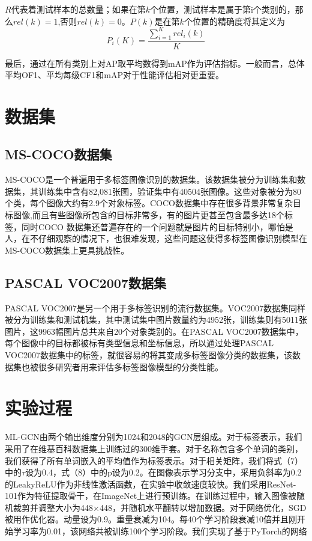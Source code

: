 $R$代表着测试样本的总数量；如果在第$k$个位置，测试样本是属于第i个类别的，那么$rel(k)=1$,否则$rel(k)=0$。$P(k)$是在第$k$个位置的精确度将其定义为
\begin{equation}
\label{dscNoStgProof0}
P_i(K) = \frac{\sum_{i=1}^{K}rel_i(k)}{K}
\end{equation}

最后，通过在所有类别上对AP取平均数得到mAP作为评估指标。一般而言，总体平均OF1、平均每级CF1和mAP对于性能评估相对更重要。

\section{数据集}

\subsection{MS-COCO数据集}
MS-COCO\cite{Jiang2016CNN}是一个普遍用于多标签图像识别的数据集。该数据集被分为训练集和数据集，其训练集中含有82,081张图，验证集中有40504张图像。这些对象被分为80个类，每个图像大约有2.9个对象标签。COCO数据集中存在很多背景非常复杂目标图像,而且有些图像所包含的目标非常多，有的图片更甚至包含最多达18个标签，同时COCO 数据集还普遍存在的一个问题就是图片的目标特别小，哪怕是人，在不仔细观察的情况下，也很难发现，这些问题这使得多标签图像识别模型在MS-COCO数据集上更具挑战性。

\subsection{PASCAL VOC2007数据集}
PASCAL VOC2007是另一个用于多标签识别的流行数据集。VOC2007数据集同样被分为训练集和测试机集，其中测试集中图片数量约为4952张，训练集则有5011张图片，这9963幅图片总共来自20个对象类别的。在PASCAL VOC2007数据集中，每个图像中的目标都被标有类型信息和坐标信息，所以通过处理PASCAL VOC2007数据集中的标签，就很容易的将其变成多标签图像分类的数据集，该数据集也被很多研究者用来评估多标签图像模型的分类性能。

\section{实验过程}

ML-GCN由两个输出维度分别为1024和2048的GCN层组成。对于标签表示，我们采用了在维基百科数据集上训练过的300维手套\cite{Xue2011Correlative}。对于名称包含多个单词的类别，我们获得了所有单词嵌入的平均值作为标签表示。对于相关矩阵，我们将式（7）中的$\tau$设为0.4，式（8）中的p设为0.2。在图像表示学习分支中，采用负斜率为0.2的LeakyReLU作为非线性激活函数，在实验中收敛速度较快。我们采用ResNet-101\cite{Read2008Multi}作为特征提取骨干，在ImageNet\cite{Tsoumakas2007Random}上进行预训练。在训练过程中，输入图像被随机裁剪并调整大小为448×448，并随机水平翻转以增加数据。对于网络优化，SGD被用作优化器。动量设为0.9。重量衰减为104。每40个学习阶段衰减10倍并且刚开始学习率为0.01，该网络共被训练100个学习阶段。我们实现了基于PyTorch的网络

